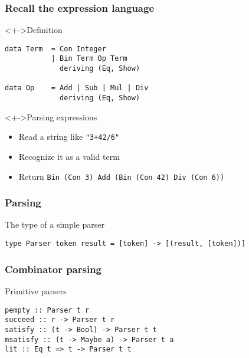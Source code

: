 \documentclass{beamer}
\subtitle
{Parsing}
\begin{document}
\begin{frame}
  \titlepage
\end{frame}



\begin{frame}[fragile]
  \frametitle{Recall the expression language}
\begin{block}<+->{Definition}
\begin{lstlisting}
data Term  = Con Integer
           | Bin Term Op Term  
             deriving (Eq, Show)
           
data Op    = Add | Sub | Mul | Div
             deriving (Eq, Show)
\end{lstlisting}
\end{block}
\begin{alertblock}<+->{Parsing expressions}
  \begin{itemize}
  \item Read a string like \texttt{"3+42/6"}
  \item Recognize it as a valid term
  \item Return \texttt{Bin (Con 3) Add (Bin (Con 42) Div (Con 6))} 
  \end{itemize}
\end{alertblock}
\end{frame}             

\begin{frame}[fragile]
  \frametitle{Parsing}
\begin{block}{The type of a simple parser}
\begin{lstlisting}
type Parser token result = [token] -> [(result, [token])]
\end{lstlisting}  
\end{block}
\end{frame}             

\begin{frame}[fragile]
  \frametitle{Combinator parsing}
  \begin{block}{Primitive parsers}
\begin{lstlisting}
pempty :: Parser t r
succeed :: r -> Parser t r
satisfy :: (t -> Bool) -> Parser t t
msatisfy :: (t -> Maybe a) -> Parser t a
lit :: Eq t => t -> Parser t t
\end{lstlisting}
  \end{block}
\end{frame}
\end{document}
